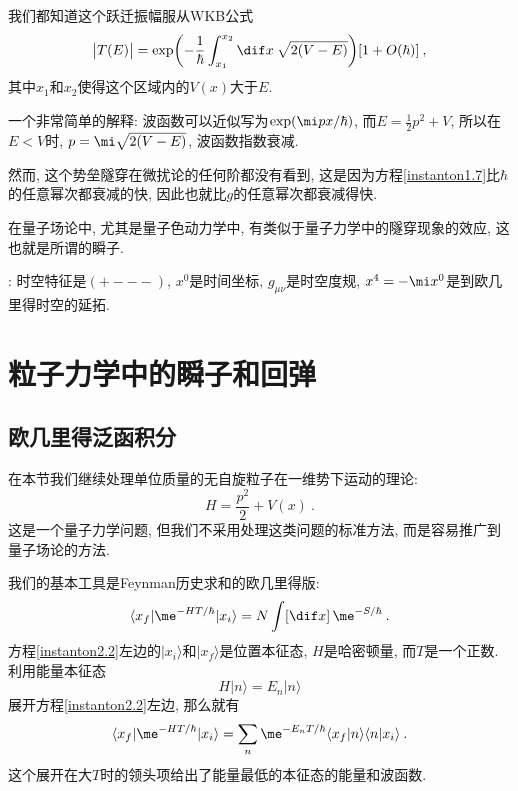 我们都知道这个跃迁振幅服从WKB公式
\begin{equation}
    \bigl\lvert T(E)\bigr\rvert =\exp\biggl(-\frac{1}{\hbar}\int_{x_{1}}^{x_{2}}\dif x\: \sqrt{2(V-E)}\biggr)[1+O(\hbar)] \:, \label{instanton1.7}
\end{equation}
其中$x_{1}$和$x_{2}$使得这个区域内的$V(x)$大于$E$. 
\begin{tcolorbox}
    一个非常简单的解释: 波函数可以近似写为$\exp(\mi p x/\hbar)$, 而$E=\frac{1}{2}p^{2}+V$, 所以在$E<V$时, $p=\mi\sqrt{2(V-E)}$, 波函数指数衰减.
\end{tcolorbox}
然而, 这个势垒隧穿在微扰论的任何阶都没有看到, 这是因为方程\eqref{instanton1.7}比$\hbar$的任意幂次都衰减的快, 因此也就比$g$的任意幂次都衰减得快.

在量子场论中, 尤其是量子色动力学中, 有类似于量子力学中的隧穿现象的效应, 这也就是所谓的瞬子.

{}: 时空特征是$({+}{-}{-}{-})$, $x^{0}$是时间坐标, $g_{\mu\nu}$是时空度规, $x^{4}=-\mi x^{0}$是到欧几里得时空的延拓.

\section{粒子力学中的瞬子和回弹} \label{instanton:sec2}

\subsection{欧几里得泛函积分} \label{instanton:sec2.1}

在本节我们继续处理单位质量的无自旋粒子在一维势下运动的理论:
\begin{equation}
    H = \frac{p^2}{2} + V(x) \:. \label{instanton2.1}
\end{equation}
这是一个量子力学问题, 但我们不采用处理这类问题的标准方法, 而是容易推广到量子场论的方法.

我们的基本工具是Feynman历史求和的欧几里得版:
\begin{equation}
    \langle x_{f} \vert \me^{-HT/\hbar} \vert x_{i}\rangle =N \int [\dif x]\, \me^{-S/\hbar} \:. \label{instanton2.2}
\end{equation}
方程\eqref{instanton2.2}左边的$\lvert x_{i}\rangle$和$\lvert x_{f}\rangle$是位置本征态, $H$是哈密顿量, 而$T$是一个正数. 利用能量本征态
\begin{equation}
    H\vert n \rangle = E_{n} \vert n\rangle \label{instanton2.3}
\end{equation}
展开方程\eqref{instanton2.2}左边, 那么就有
\begin{equation}
    \langle x_{f} \vert \me^{-HT/\hbar} \vert x_{i}\rangle 
    = \sum_{n}\me^{-E_{n}T/\hbar}  \langle x_{f} \vert n\rangle \langle n \vert x_{i}\rangle  \:. \label{instanton2.4}
\end{equation}
这个展开在大$T$时的领头项给出了能量最低的本征态的能量和波函数.

